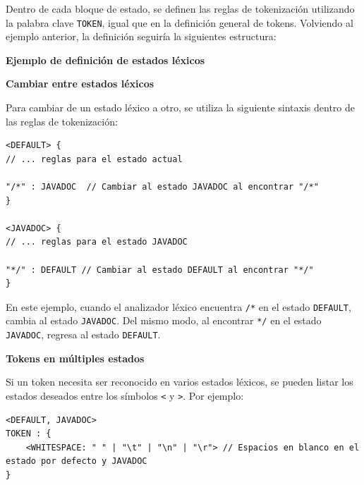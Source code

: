 \lstset{inputencoding=utf8/latin1}


Dentro de cada bloque de estado, se definen las reglas de tokenización utilizando la palabra clave \lstinline|TOKEN|, igual que en la definición general de tokens.
Volviendo al ejemplo anterior, la definición seguiría la siguientes estructura:

\phantom{text}

\noindent \textbf{Ejemplo de definición de estados léxicos}

\phantom{text}

\lstset{inputencoding=utf8/latin1}



\phantom{text}

\noindent \textbf{Cambiar entre estados léxicos}

\phantom{text}

Para cambiar de un estado léxico a otro, se utiliza la siguiente sintaxis dentro de las reglas de tokenización:

\lstset{inputencoding=utf8/latin1}
\begin{lstlisting}
<DEFAULT> {
// ... reglas para el estado actual

"/*" : JAVADOC  // Cambiar al estado JAVADOC al encontrar "/*" 
} 

<JAVADOC> {
// ... reglas para el estado JAVADOC 

"*/" : DEFAULT // Cambiar al estado DEFAULT al encontrar "*/"
}
\end{lstlisting}

En este ejemplo, cuando el analizador léxico encuentra \lstinline|/*| en el estado \lstinline|DEFAULT|, cambia al estado \lstinline|JAVADOC|. Del mismo modo, al encontrar \lstinline|*/| en el estado \lstinline|JAVADOC|, regresa al estado \lstinline|DEFAULT|.

\phantom{text}

\noindent \textbf{Tokens en múltiples estados}

\phantom{text}

Si un token necesita ser reconocido en varios estados léxicos, se pueden listar los estados deseados entre los símbolos \lstinline|<| y \lstinline|>|. Por ejemplo:

\lstset{inputencoding=utf8/latin1}
\begin{lstlisting}
<DEFAULT, JAVADOC>
TOKEN : {
	<WHITESPACE: " " | "\t" | "\n" | "\r"> // Espacios en blanco en el estado por defecto y JAVADOC
}
\end{lstlisting}

